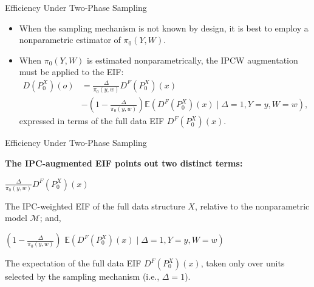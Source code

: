 \documentclass{beamer}
\newcommand{\E}{\mathbb{E}}
\newcommand{\M}{\mathcal{M}}
\begin{document}

\begin{frame}[c]{Efficiency Under Two-Phase Sampling}

\begin{center}
\begin{itemize}
  \itemsep10pt
  \item When the sampling mechanism is not known by design, it is best to employ
    a nonparametric estimator of $\pi_0(Y, W)$.
  \item When $\pi_0(Y, W)$ is estimated nonparametrically, the IPCW augmentation
    must be applied to the EIF:
    \begin{align*}
      D(P_0^X)(o) &= \frac{\Delta}{\pi_0(y, w)} D^F(P_0^X)(x) \\&- \left(1 -
        \frac{\Delta} {\pi_0(y, w)}\right)\E(D^F(P_0^X)(x) \mid
        \Delta = 1, Y = y, W = w),
    \end{align*}
    expressed in terms of the full data EIF $D^F(P_0^X)(x)$.
\end{itemize}
\end{center}

\note{
}

\end{frame}


\begin{frame}[c]{Efficiency Under Two-Phase Sampling}

\begin{center}
  \textbf{The IPC-augmented EIF points out two distinct terms:}
  \begin{tcolorbox}
    $\frac{\Delta}{\pi_0(y, w)}D^F(P_0^X)(x)$
  \end{tcolorbox}
  The IPC-weighted EIF of the full data structure $X$, relative to the
  nonparametric model $\M$; and,
  \vspace{1em}
  \begin{tcolorbox}
    $\left(1 - \frac{\Delta}{\pi_0(y, w)}\right)$ $\E(D^F(P_0^X)(x) \mid
      \Delta = 1, Y = y, W = w)$
  \end{tcolorbox}
  The expectation of the full data EIF $D^F(P_0^X)(x)$, taken only over units
  selected by the sampling mechanism (i.e., $\Delta = 1$).
\end{center}

\note{
}

\end{frame}
\end{document}
